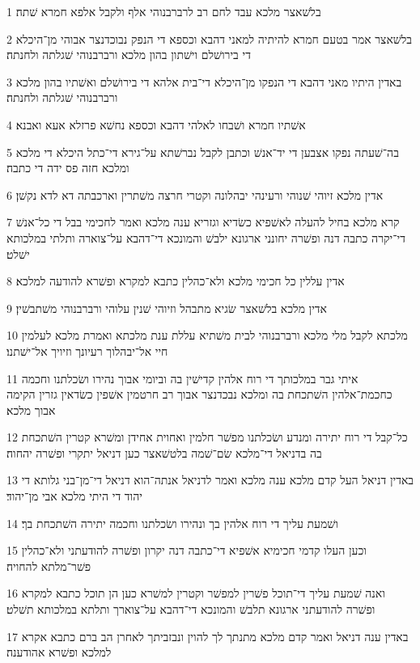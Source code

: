 \par 1 בלשׁאצר מלכא עבד לחם רב לרברבנוהי אלף ולקבל אלפא חמרא שׁתה׃
\par 2 בלשׁאצר אמר בטעם חמרא להיתיה למאני דהבא וכספא די הנפק נבוכדנצר אבוהי מן־היכלא די בירושׁלם וישׁתון בהון מלכא ורברבנוהי שׁגלתה ולחנתה׃
\par 3 באדין היתיו מאני דהבא די הנפקו מן־היכלא די־בית אלהא די בירושׁלם ואשׁתיו בהון מלכא ורברבנוהי שׁגלתה ולחנתה׃
\par 4 אשׁתיו חמרא ושׁבחו לאלהי דהבא וכספא נחשׁא פרזלא אעא ואבנא׃
\par 5 בה־שׁעתה נפקו אצבען די יד־אנשׁ וכתבן לקבל נברשׁתא על־גירא די־כתל היכלא די מלכא ומלכא חזה פס ידה די כתבה׃
\par 6 אדין מלכא זיוהי שׁנוהי ורעינהי יבהלונה וקטרי חרצה משׁתרין וארכבתה דא לדא נקשׁן׃
\par 7 קרא מלכא בחיל להעלה לאשׁפיא כשׂדיא וגזריא ענה מלכא ואמר לחכימי בבל די כל־אנשׁ די־יקרה כתבה דנה ופשׁרה יחונני ארגונא ילבשׁ והמונכא די־דהבא על־צוארה ותלתי במלכותא ישׁלט׃
\par 8 אדין עללין כל חכימי מלכא ולא־כהלין כתבא למקרא ופשׁרא להודעה למלכא׃
\par 9 אדין מלכא בלשׁאצר שׂגיא מתבהל וזיוהי שׁנין עלוהי ורברבנוהי משׁתבשׁין׃
\par 10 מלכתא לקבל מלי מלכא ורברבנוהי לבית משׁתיא עללת ענת מלכתא ואמרת מלכא לעלמין חיי אל־יבהלוך רעיונך וזיויך אל־ישׁתנו׃
\par 11 איתי גבר במלכותך די רוח אלהין קדישׁין בה וביומי אבוך נהירו ושׂכלתנו וחכמה כחכמת־אלהין השׁתכחת בה ומלכא נבכדנצר אבוך רב חרטמין אשׁפין כשׂדאין גזרין הקימה אבוך מלכא׃
\par 12 כל־קבל די רוח יתירה ומנדע ושׂכלתנו מפשׁר חלמין ואחוית אחידן ומשׁרא קטרין השׁתכחת בה בדניאל די־מלכא שׂם־שׁמה בלטשׁאצר כען דניאל יתקרי ופשׁרה יהחוה׃
\par 13 באדין דניאל העל קדם מלכא ענה מלכא ואמר לדניאל אנתה־הוא דניאל די־מן־בני גלותא די יהוד די היתי מלכא אבי מן־יהוד׃
\par 14 ושׁמעת עליך די רוח אלהין בך ונהירו ושׂכלתנו וחכמה יתירה השׁתכחת בך׃
\par 15 וכען העלו קדמי חכימיא אשׁפיא די־כתבה דנה יקרון ופשׁרה להודעתני ולא־כהלין פשׁר־מלתא להחויה׃
\par 16 ואנה שׁמעת עליך די־תוכל פשׁרין למפשׁר וקטרין למשׁרא כען הן תוכל כתבא למקרא ופשׁרה להודעתני ארגונא תלבשׁ והמונכא די־דהבא על־צוארך ותלתא במלכותא תשׁלט׃
\par 17 באדין ענה דניאל ואמר קדם מלכא מתנתך לך להוין ונבזביתך לאחרן הב ברם כתבא אקרא למלכא ופשׁרא אהודענה׃
